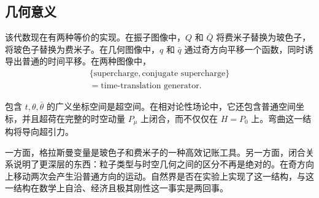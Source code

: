 \begin{classroomqa}
\end{classroomqa}

\begin{classroomqa}
\end{classroomqa}


\subsection{几何意义}

该代数现在有两种等价的实现。在振子图像中，\(Q\) 和 \(\bar Q\) 将费米子替换为玻色子，将玻色子替换为费米子。在几何图像中，\(q\) 和 \(\bar q\) 通过奇方向平移一个函数，同时诱导出普通的时间平移。在两种图像中，
\begin{equation}
\begin{gathered}
\{\text{supercharge},\text{conjugate supercharge}\}\\
=\text{time-translation generator}.
\end{gathered}
\end{equation}

包含 \(t,\theta,\bar\theta\) 的广义坐标空间是超空间。在相对论性场论中，它还包含普通空间坐标，并且超荷在完整的时空动量 \(P_\mu\) 上闭合，而不仅仅在 \(H=P_0\) 上。弯曲这一结构将导向超引力。

一方面，格拉斯曼变量是玻色子和费米子的一种高效记账工具。另一方面，闭合关系说明了更深层的东西：粒子类型与时空几何之间的区分不再是绝对的。在奇方向上移动两次会产生沿普通方向的运动。自然界是否在实验上实现了这一结构，与这一结构在数学上自洽、经济且极其刚性这一事实是两回事。

